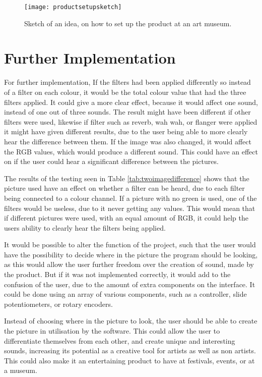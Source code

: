 \begin{figure}[!h]
\centering
\texttt{[image: productsetupsketch]}
\caption{\label{Fig:productsetupsketch} Sketch of an idea, on how to set up the product at an art museum.}
\end{figure}

\section{Further Implementation}
For further implementation, If the filters had been applied differently so instead of a filter on each colour, it would be the total colour value that had the three filters applied. It could give a more clear effect, because it would affect one sound, instead of one out of three sounds.
The result might have been different if other filters were used, likewise if filter such as reverb, wah wah, or flanger were applied it might have given different results, due to the user being able to more clearly hear the difference between them. If the image was also changed, it would affect the RGB values, which would produce a different sound. This could have an effect on if the user could hear a significant difference between the pictures.

The results of the testing seen in Table \ref{tab:twoimagedifference} shows that the picture used have an effect on whether a filter can be heard, due to each filter being connected to a colour channel. If a picture with no green is used, one of the filters would be useless, due to it never getting any values. This would mean that if different pictures were used, with an equal amount of RGB, it could help the users ability to clearly hear the filters being applied.

It would be possible to alter the function of the project, such that the user would have the possibility to decide where in the picture the program should be looking, as this would allow the user further freedom over the creation of sound, made by the product. But if it was not implemented correctly, it would add to the confusion of the user, due to the amount of extra components on the interface. It could be done using an array of various components, such as a controller, slide potentiometers, or rotary encoders.

Instead of choosing where in the picture to look, the user should be able to create the picture in utilisation by the software. This could allow the user to differentiate themselves from each other, and create unique and interesting sounds, increasing its potential as a creative tool for artists as well as non artists. This could also make it an entertaining product to have at festivals, events, or at a museum.

